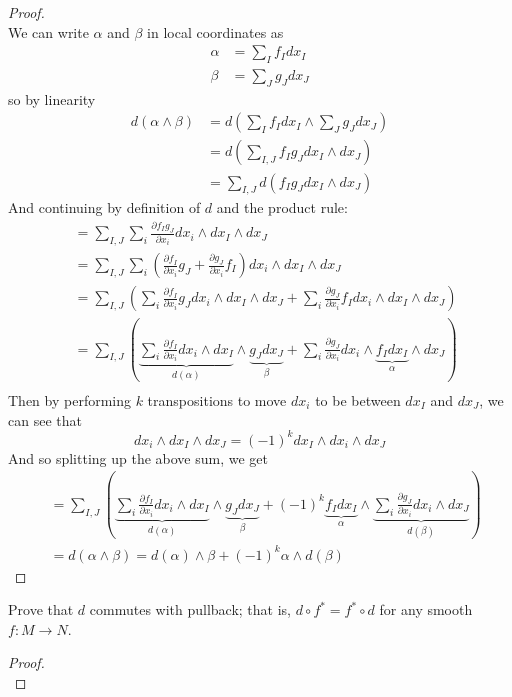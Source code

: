 \documentclass{article}
\newenvironment{problem}[2][Problem]{\begin{trivlist}
\item[\hskip \labelsep {\bfseries #1}\hskip \labelsep {\bfseries #2.}]}{\end{trivlist}}
\begin{document}
\begin{proof} \text{} \\
  We can write $\alpha$ and $\beta$ in local coordinates as \begin{align*}
    \alpha &= \sum_I f_I dx_I \\
    \beta &= \sum_J g_J dx_J
  \end{align*} so by linearity \begin{align*}
    d(\alpha \wedge \beta)
      &= d\left(\sum_I f_I dx_I \wedge \sum_J g_J dx_J\right) \\
      &= d\left(\sum_{I,J} f_I g_J dx_I \wedge dx_J\right) \\
      &= \sum_{I,J} d(f_I g_J dx_I \wedge dx_J)
  \end{align*}
  And continuing by definition of $d$ and the product rule:
  \begin{align*}
      &= \sum_{I,J} \sum_i \frac{\partial f_I g_J}{\partial x_i}dx_i \wedge dx_I \wedge dx_J \\
      &= \sum_{I,J} \sum_i \left(\frac{\partial f_I}{\partial x_i}g_J + \frac{\partial g_J}{\partial x_i}f_I\right)dx_i \wedge dx_I \wedge dx_J \\
      &= \sum_{I,J} \left(
        \sum_i \frac{\partial f_I}{\partial x_i}g_J dx_i \wedge dx_I \wedge dx_J +
        \sum_i \frac{\partial g_J}{\partial x_i}f_Idx_i \wedge dx_I \wedge dx_J
      \right) \\
      &= \sum_{I,J} \left(
        \underbrace{\sum_i \frac{\partial f_I}{\partial x_i} dx_i \wedge dx_I}_{d(\alpha)} \wedge \underbrace{g_Jdx_J}_{\beta} +
        \sum_i \frac{\partial g_J}{\partial x_i}dx_i \wedge \underbrace{f_Idx_I}_\alpha \wedge dx_J
      \right) \\
  \end{align*}
  Then by performing $k$ transpositions to move $dx_i$ to be between $dx_I$ and $dx_J$,
  we can see that \[
    dx_i \wedge dx_I \wedge dx_J = (-1)^kdx_I \wedge dx_i \wedge dx_J
  \]
  And so splitting up the above sum, we get \begin{align*}
    &= \sum_{I,J} \left(
      \underbrace{\sum_i \frac{\partial f_I}{\partial x_i} dx_i \wedge dx_I}_{d(\alpha)} \wedge \underbrace{g_Jdx_J}_{\beta} +
      (-1)^k\underbrace{f_Idx_I}_\alpha \wedge \underbrace{\sum_i \frac{\partial g_J}{\partial x_i} dx_i \wedge dx_J}_{d(\beta)}
    \right)\\
    &= d(\alpha\wedge\beta) = d(\alpha)\wedge\beta + (-1)^k\alpha\wedge d(\beta)
  \end{align*}

\end{proof}

\pagebreak

\begin{problem}{6}
  Prove that $d$ commutes with pullback; that is, $d \circ f^* = f^* \circ d$
  for any smooth $f\colon M \rightarrow N$.
\end{problem}

\begin{proof} \text{} \\
\end{proof}
\end{document}
